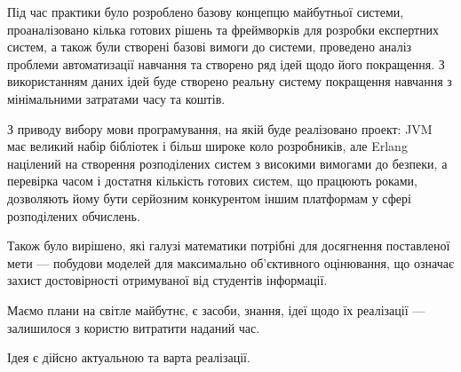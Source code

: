 
Під час практики було розроблено базову концепцю майбутньої системи,
проаналізовано кілька готових рішень та фреймворків для розробки експертних
систем, а також були створені базові вимоги до системи,
проведено аналіз проблеми автоматизації навчання та створено ряд ідей щодо
його покращення.
З використанням даних ідей буде створено реальну систему покращення навчання з
мінімальними затратами часу та коштів.

З приводу вибору мови програмування, на якій буде реалізовано проект: JVM має
великий набір бібліотек і більш широке коло розробників, але Erlang націлений
на створення розподілених систем з високими вимогами до безпеки, а перевірка
часом і достатня кількість готових систем, що працюють роками, дозволяють
йому бути серйозним конкурентом іншим платформам у сфері розподілених
обчислень.

Також було вирішено, які галузі математики потрібні для досягнення поставленої
мети --- побудови моделей для максимально об’єктивного оцінювання, що означає
захист достовірності отримуваної від студентів інформації.

Маємо плани на світле майбутнє, є засоби, знання, ідеї щодо їх реалізації ---
залишилося з користю витратити наданий час.

Ідея є дійсно актуальною та варта реалізації.
